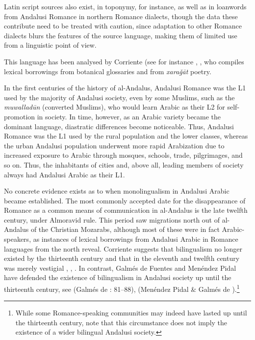 \documentclass[output=paper,modfonts,nonflat]{langsci/langscibook}
\begin{document}
Latin script sources also exist, in toponymy, for instance, as well as in loanwords from Andalusi Romance in northern Romance dialects, though the data these contribute need to be treated with caution, since adaptation to other Romance dialects blurs the features of the source language, making them of limited use from a linguistic point of view. 

This language has been analysed by Corriente (see for instance \citep{Corriente1995}, \citep{Corriente2000}, \citep{Corriente2012} who compiles lexical borrowings from botanical glossaries and from \textit{xaraǧāt} poetry.  

In the first centuries of the history of al-Andalus, Andalusi Romance was the L1 used by the majority of Andalusi society, even by some Muslims, such as the \textit{muwalladūn} (converted Muslims), who would learn Arabic as their L2 for self-promotion in society. In time, however, as an Arabic variety became the dominant language, diastratic differences become noticeable. Thus, Andalusi Romance was the L1 used by the rural population and the lower classes, whereas the urban Andalusi population underwent more rapid Arabization due to increased exposure to Arabic through mosques, schools, trade, pilgrimages, and so on. Thus, the inhabitants of cities and, above all, leading members of society always had Andalusi Arabic as their L1. 

No concrete evidence exists as to when monolingualism in Andalusi Arabic became established. The most commonly accepted date for the disappearance of Romance as a common means of communication in al-Andalus is the late twelfth century, under Almoravid rule. This period saw migrations north out of al-Andalus of the Christian Mozarabs, although most of these were in fact Arabic-speakers, as instances of lexical borrowings from Andalusi Arabic in Romance languages from the north reveal. Corriente suggests that bilingualism no longer existed by the thirteenth century and that in the eleventh and twelfth century was merely vestigial \citep{Corriente1997a}, \citep[443]{Corriente1992}, \citep{Corriente2005}. In contrast, Galmés de Fuentes and Menéndez Pidal have defended the existence of bilingualism in Andalusi society up until the thirteenth century, see (Galmés de \citealt{Fuentes1994}: 81–88), (Menéndez Pidal \& Galmés de \citealt{Fuentes2001}).\footnote{While some Romance-speaking communities may indeed have lasted up until the thirteenth century, note that this circumstance does not imply the existence of a wider bilingual Andalusi society.}  
\end{document}

